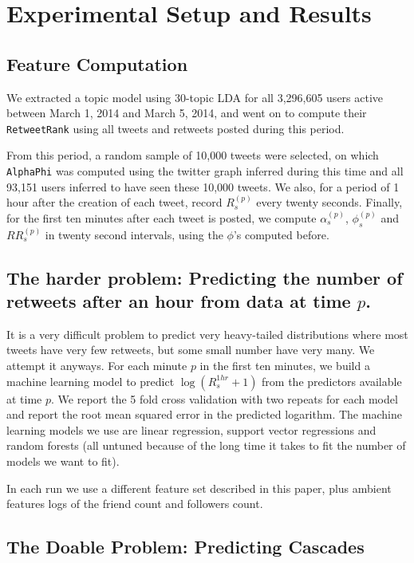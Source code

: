 \section{Experimental Setup and Results}

\subsection{Feature Computation}

We extracted a topic model using 30-topic LDA for all 3,296,605 users active between March 1, 2014 and March 5, 2014, and went on to compute their \texttt{RetweetRank} using all tweets and retweets posted during this period.  

From this period, a random sample of 10,000 tweets were selected, on which \texttt{AlphaPhi} was computed using the twitter graph inferred during this time and all 93,151 users inferred to have seen these 10,000 tweets.  
We also, for a period of 1 hour after the creation of each tweet, record $R_s^{(p)}$ every twenty seconds.
Finally, for the first ten minutes after each tweet is posted, we compute $\alpha_s^{(p)}$, $\phi_s^{(p)}$ and $RR_s^{(p)}$ in twenty second intervals, using the $\phi$'s computed before.


\subsection{The harder problem: Predicting the number of retweets after an hour from data at time $p$.}

It is a very difficult problem to predict very heavy-tailed distributions where most tweets have very few retweets, but some small number have very many.
We attempt it anyways. 
For each minute $p$ in the first ten minutes, we build a machine learning model to predict $\log(R_s^{1hr}+1)$ from the predictors available at time $p$.  
We report the 5 fold cross validation with two repeats for each model and report the root mean squared error in the predicted logarithm.  
The machine learning models we use are linear regression, support vector regressions and random forests (all untuned because of the long time it takes to fit the number of models we want to fit).  

In each run we use a different feature set described in this paper, plus ambient features logs of the friend count and followers count.  

\subsection{The Doable Problem: Predicting Cascades}

